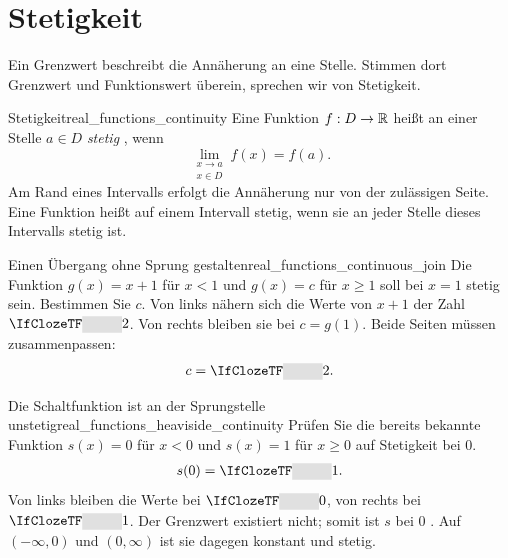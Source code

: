 \section{Stetigkeit}
\label{sec:real_functions_continuity}
Ein Grenzwert beschreibt die Annäherung an eine Stelle. Stimmen dort
Grenzwert und Funktionswert überein, sprechen wir von Stetigkeit.
\par\noindent\begin{minipage}{\linewidth}
\begin{FunctionPropertyBox}{Stetigkeit}{real_functions_continuity}
  Eine Funktion $f:D\to\mathbb{R}$ heißt an einer Stelle $a\in D$
  \emph{stetig} , wenn
  \[
    \lim_{\substack{x\to a\\x\in D}}f(x)=f(a).
  \]
  Am Rand eines Intervalls erfolgt die Annäherung nur von der zulässigen Seite.
  Eine Funktion heißt auf einem Intervall stetig, wenn sie an jeder
  Stelle dieses Intervalls stetig ist.
\end{FunctionPropertyBox}
\begin{ExampleBox}[before skip=0.3\baselineskip]{Einen Übergang ohne Sprung gestalten}{real_functions_continuous_join}
  Die Funktion $g(x)=x+1$ für $x<1$ und $g(x)=c$ für $x\ge1$
  soll bei $x=1$ stetig sein. Bestimmen Sie $c$.
  Von links nähern sich die Werte von $x+1$ der Zahl $\Cloze{1cm}{2}$.
  Von rechts bleiben sie bei $c=g(1)$. Beide Seiten müssen zusammenpassen:
  \[
    c=\Cloze{1cm}{2}.
  \]
\end{ExampleBox}
\end{minipage}

\begin{center}
\end{center}
\begin{ExampleBox}{Die Schaltfunktion ist an der Sprungstelle unstetig}{real_functions_heaviside_continuity}
  Prüfen Sie die bereits bekannte Funktion $s(x)=0$ für $x<0$ und
  $s(x)=1$ für $x\ge0$ auf Stetigkeit bei $0$.
  \[
    s(0)=\Cloze{1cm}{1}.
  \]
  Von links bleiben die Werte bei $\Cloze{1cm}{0}$, von rechts bei
  $\Cloze{1cm}{1}$. Der Grenzwert existiert nicht; somit ist $s$ bei $0$
  . Auf $(-\infty,0)$ und $(0,\infty)$
  ist sie dagegen konstant und stetig.
\end{ExampleBox}


